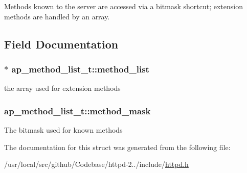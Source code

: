 Methods known to the server are accessed via a bitmask shortcut; extension methods are handled by an array. 

\subsection{Field Documentation}
\subsubsection[{\texorpdfstring{method\+\_\+list}{method_list}}]{$\ast$ ap\+\_\+method\+\_\+list\+\_\+t\+::method\+\_\+list}\hypertarget{structap__method__list__t_a1062e3a59fa2aa181f3d87a05bde21c9}{}\label{structap__method__list__t_a1062e3a59fa2aa181f3d87a05bde21c9}
the array used for extension methods 
\subsubsection[{\texorpdfstring{method\+\_\+mask}{method_mask}}]{ ap\+\_\+method\+\_\+list\+\_\+t\+::method\+\_\+mask}\hypertarget{structap__method__list__t_ab6731b9ec374b50374eafbbb4fdb31f5}{}\label{structap__method__list__t_ab6731b9ec374b50374eafbbb4fdb31f5}
The bitmask used for known methods 

The documentation for this struct was generated from the following file\+:\begin{DoxyCompactItemize}
\item 
/usr/local/src/github/\+Codebase/httpd-\/2../include/\hyperlink{httpd_8h}{httpd.\+h}\end{DoxyCompactItemize}
